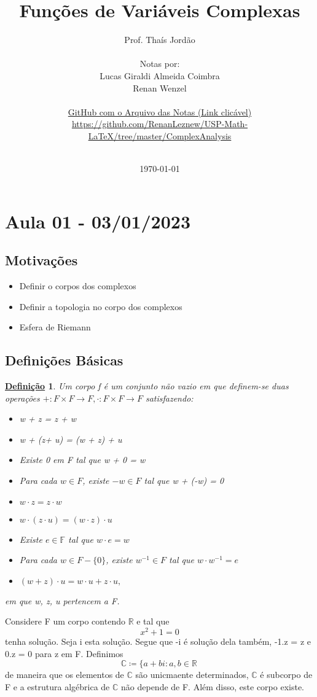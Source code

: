 \documentclass{article}
\title{Fun\c c\~oes de Vari\'aveis Complexas}
\author{Prof. Tha\'is Jord\~ao\\
  \vspace{2cm}\\
  Notas por:\\
  Lucas Giraldi Almeida Coimbra\\
  Renan Wenzel\\
  \vspace{4cm}\\
  \href{https://github.com/RenanLeznew/USP-Math-LaTeX/tree/master/ComplexAnalysis}{GitHub com o Arquivo das Notas (Link clic\'avel)}\\
  \url{https://github.com/RenanLeznew/USP-Math-LaTeX/tree/master/ComplexAnalysis}\\
  \vspace{4cm}\\
}
\date{\today}
\newtheorem*{def*}{\underline{Defini\c c\~ao}}
\begin{document}
\maketitle
\newpage
\tableofcontents
\newpage

\section{Aula 01 - 03/01/2023}
\subsection{Motiva\c c\~oes}
\begin{itemize}
  \item Definir o corpos dos complexos
  \item Definir a topologia no corpo dos complexos
  \item Esfera de Riemann
\end{itemize}

\subsection{Defini\c c\~oes B\'asicas}
\begin{def*}
  Um corpo f \'e um conjunto n\~ao vazio em que definem-se duas opera\c c\~oes $+:F\times{F}\rightarrow F, \cdot:F\times{F}\rightarrow F$ satisfazendo:
  \begin{itemize}
    \item[i)] w + z = z + w
    \item[ii)] w + (z+ u) = (w + z) + u
    \item[iii)] Existe 0 em F tal que w + 0 = w
    \item[iv)] Para cada $w\in F$, existe $-w \in F$ tal que w + (-w) = 0
    \item[v)] $w\cdot z = z\cdot w$
    \item[vi)] $w\cdot(z\cdot u) = (w\cdot z)\cdot u$
    \item[vii)] Existe $e\in \mathbb{F}$ tal que $w\cdot{e} = w$
    \item[viii)] Para cada $w\in{F-\{0\}}$, existe $w ^{-1}\in{F}$ tal que $w\cdot w ^{-1} = e$
    \item[ix)] $(w+z)\cdot{u} = w\cdot u + z\cdot u,$
  \end{itemize}
  em que w, z, u pertencem a F.
\end{def*}
Considere F um corpo contendo $\mathbb{R}$ e tal que 
$$
x ^{2} + 1 = 0
$$
tenha solu\c c\~ao. Seja i esta solu\c c\~ao. Segue que -i \'e solu\c c\~ao dela tamb\'em, -1.z = z e 0.z = 0 para z em F. Definimos
$$
\mathbb{C}\coloneqq  \{a + bi: a, b\in \mathbb{R}\,
  $$
  de maneira que os elementos de $\mathbb{C}$ s\~ao unicmaente determinados, $\mathbb{C}$ \'e subcorpo de F e a estrutura 
  alg\'ebrica de $\mathbb{C}$ n\~ao depende de F. Al\'em disso, este corpo existe.
\end{document}
